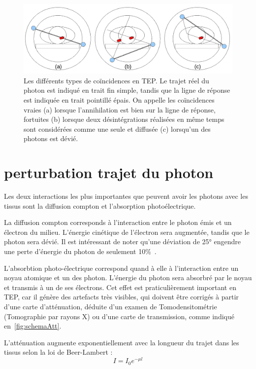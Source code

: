 \begin{figure}
\centering
\includegraphics[width=12cm]{images/schemaDetections}
\caption[Les différents types de coïncidences en TEP]{Les différents types de coïncidences en TEP. Le trajet réel du photon est indiqué en trait fin simple, tandis que la ligne de réponse est indiquée en trait pointillé épais. On appelle les coïncidences vraies (a) lorsque l'annihilation est bien sur la ligne de réponse, fortuites (b) lorsque deux désintégrations réalisées en même temps sont considérées comme une seule et diffusée (c) lorsqu'un des photons est dévié.}
\label{fig:schemaDetections}
\end{figure}



	\section{perturbation trajet du photon}

Les deux interactions les plus importantes que peuvent avoir les photons avec les tissus sont la diffusion compton et l'absorption photoélectrique.

La diffusion compton corresponds à l'interaction entre le photon émis et un électron du milieu. L'énergie cinétique de l'électron sera augmentée, tandis que le photon sera dévié. Il est intéressant de noter qu'une déviation de 25° engendre une perte d'énergie du photon de seulement 10\%~\cite{evans1955atomic}.

L'absorbtion photo-électrique correspond quand à elle à l'interaction entre un noyau atomique et un des photon. L'énergie du photon sera absorbré par le noyau et transmis à un de ses électrons. Cet effet est praticulièrement important en TEP, car il génère des artefacts très visibles, qui doivent être corrigés à partir d'une carte d'atténuation, déduite d'un examen de Tomodensitométrie (Tomographie par rayons X) ou d'une carte de transmission, comme indiqué en~\ref{fig:schemaAtt}.

L'atténuation augmente exponentiellement avec la longueur du trajet dans les tissus selon la loi de Beer-Lambert :
\begin{equation}
I = I_0 e^{-\mu l}
\end{equation}

